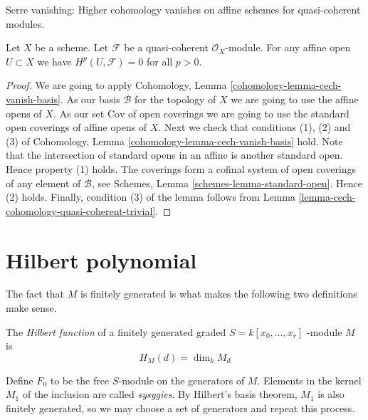 \begin{lemma}
\label{lemma-quasi-coherent-affine-cohomology-zero}
\begin{slogan}
Serre vanishing: Higher cohomology vanishes on affine schemes
for quasi-coherent modules.
\end{slogan}
Let $X$ be a scheme.
Let $\mathcal{F}$ be a quasi-coherent $\mathcal{O}_X$-module.
For any affine open $U \subset X$ we have
$H^p(U, \mathcal{F}) = 0$ for all $p > 0$.
\end{lemma}

\begin{proof}
We are going to apply
Cohomology, Lemma \ref{cohomology-lemma-cech-vanish-basis}.
As our basis $\mathcal{B}$ for the topology of $X$ we are going to use
the affine opens of $X$.
As our set $\text{Cov}$ of open coverings we are going to use the standard
open coverings of affine opens of $X$.
Next we check that conditions (1), (2) and (3) of
Cohomology, Lemma \ref{cohomology-lemma-cech-vanish-basis}
hold. Note that the intersection of standard opens in an affine is
another standard open. Hence property (1) holds.
The coverings form a cofinal system of open coverings of any element
of $\mathcal{B}$, see
Schemes, Lemma \ref{schemes-lemma-standard-open}.
Hence (2) holds.
Finally, condition (3) of the lemma follows from
Lemma \ref{lemma-cech-cohomology-quasi-coherent-trivial}.
\end{proof}

\section{Hilbert polynomial}
\label{section-Hilbert-polynomial}

The fact that $M$ is finitely generated is what makes the following two
definitions make sense.

\begin{definition}
\label{definition-Hilbert-function}
The {\it Hilbert function} of a finitely generated graded $S=k[x_0,\ldots,x_r]$ 
-module $M$ is
$$
H_M(d)=\dim_kM_d
$$
\end{definition}

\begin{definition}
\label{definition-sysygy}
Define $F_0$ to be the free $S$-module on the generators of $M$. Elements in the
 kernel $M_1$ of the inclusion are called {\it sysygies}. By Hilbert's basis
theorem, $M_1$ is also finitely generated, so we may choose a set of generators
and repeat this process.
\end{definition}

